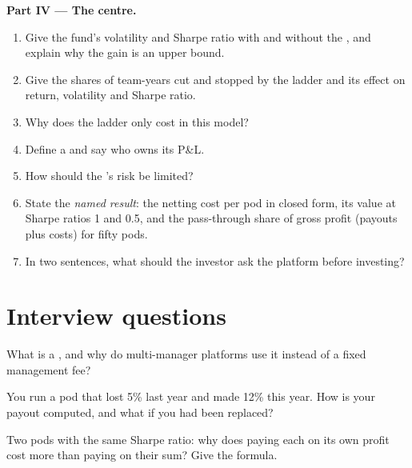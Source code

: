 \begin{problem}
\medskip\noindent\textbf{Part IV --- The centre.}
\begin{enumerate}[resume]
\item Give the fund's volatility and Sharpe ratio with and without the , and explain why the gain is an upper bound.
\item Give the shares of team-years cut and stopped by the ladder and its effect on return, volatility and Sharpe ratio.
\item Why does the ladder only cost in this model?
\item Define a  and say who owns its P\&L.
\item How should the 's risk be limited?
\item State the \emph{named result}: the netting cost per pod in closed form, its value at Sharpe ratios 1 and 0.5, and the pass-through share of
gross profit (payouts plus costs) for fifty pods.
\item In two sentences, what should the investor ask the platform before investing?
\end{enumerate}
\end{problem}

\section{Interview questions}

\begin{interviewq}\label{iq:fm:the-multi-manager-platform:1}
What is a , and why do multi-manager platforms use it instead of a fixed management fee?
\end{interviewq}

\begin{interviewq}\label{iq:fm:the-multi-manager-platform:2}
You run a pod that lost 5\% last year and made 12\% this year. How is your payout computed, and what if you had been replaced?
\end{interviewq}

\begin{interviewq}\label{iq:fm:the-multi-manager-platform:3}
Two pods with the same Sharpe ratio: why does paying each on its own profit cost more than paying on their sum? Give the formula.
\end{interviewq}

